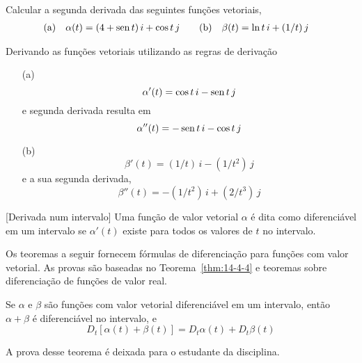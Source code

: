 \begin{exc}
Calcular a segunda derivada das seguintes funções vetoriais,
\begin{align*}
\rm{(a)} & \quad \alpha(t)=(4+\operatorname{sen} t)\, i + \cos t\, j \quad &\rm{(b)}&\quad \beta(t)=\ln t\, i + (1/t) \, j
\end{align*}
\end{exc}

\solo
Derivando as funções vetoriais utilizando as regras de derivação
\begin{enumerate}
  \item[(a)]
  \begin{equation*}
    \alpha'(t)=\cos t\, i -\operatorname{sen} t\, j
  \end{equation*}
  e segunda derivada resulta em
\begin{equation*}
    \alpha''(t)=-\operatorname{sen} t\, i -\cos t\, j
  \end{equation*}

  \item[(b)]
  \begin{equation*}
\beta'(t)=(1/t)\, i - (1/t^{2}) \, j
  \end{equation*}
e a sua segunda derivada,
  \begin{equation*}
\beta''(t)=-(1/t^{2})\, i +(2/t^{3}) \, j
  \end{equation*}
\end{enumerate}


\begin{defi}\label{def:14-5-5}[Derivada num intervalo]
Uma função de valor vetorial \(\alpha\) é dita como diferenciável em um intervalo se \(\alpha'(t)\) existe para todos
os valores de \(t\) no intervalo.
\end{defi}

Os teoremas a seguir fornecem fórmulas de diferenciação para funções com valor vetorial. As provas são baseadas no
Teorema~\ref{thm:14-4-4} e teoremas sobre diferenciação de funções de valor real.
\begin{teo}\label{thm:14-5-6}
Se \(\alpha\) e \(\beta\) são funções com valor vetorial diferenciável em um intervalo, então \(\alpha + \beta\) é
diferenciável no intervalo, e
\begin{equation*}
D_{t}[\alpha(t) +\beta(t)] = D_{t}\alpha(t) + D_{t}\beta(t)
\end{equation*}
\end{teo}

A prova desse teorema é deixada para o estudante da disciplina.

